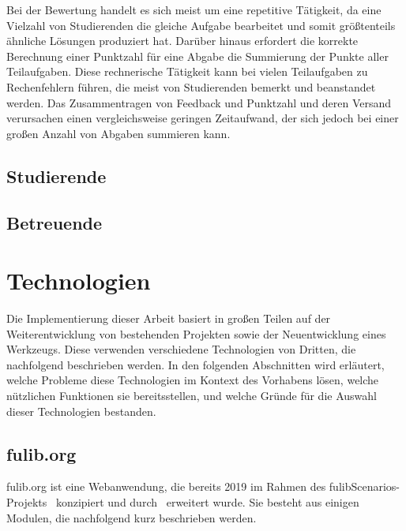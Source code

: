 Bei der Bewertung handelt es sich meist um eine repetitive Tätigkeit, da eine Vielzahl von Studierenden die gleiche Aufgabe bearbeitet und somit größtenteils ähnliche Lösungen produziert hat.
Darüber hinaus erfordert die korrekte Berechnung einer Punktzahl für eine Abgabe die Summierung der Punkte aller Teilaufgaben.
Diese rechnerische Tätigkeit kann bei vielen Teilaufgaben zu Rechenfehlern führen, die meist von Studierenden bemerkt und beanstandet werden.
Das Zusammentragen von Feedback und Punktzahl und deren Versand verursachen einen vergleichsweise geringen Zeitaufwand, der sich jedoch bei einer großen Anzahl von Abgaben summieren kann.

\subsection{Studierende}\label{subsec:students}


\subsection{Betreuende}\label{subsec:teaching-assistants}


\section{Technologien}\label{sec:tech}

Die Implementierung dieser Arbeit basiert in großen Teilen auf der Weiterentwicklung von bestehenden Projekten sowie der Neuentwicklung eines Werkzeugs.
Diese verwenden verschiedene Technologien von Dritten, die nachfolgend beschrieben werden.
In den folgenden Abschnitten wird erläutert, welche Probleme diese Technologien im Kontext des Vorhabens lösen, welche nützlichen Funktionen sie bereitsstellen, und welche Gründe für die Auswahl dieser Technologien bestanden.

\subsection{fulib.org}\label{subsec:fulib.org}

fulib.org ist eine Webanwendung, die bereits 2019 im Rahmen des fulibScenarios-Projekts~\cite{explain} konzipiert und durch~\cite{bachelor-thesis} erweitert wurde.
Sie besteht aus einigen Modulen, die nachfolgend kurz beschrieben werden.


